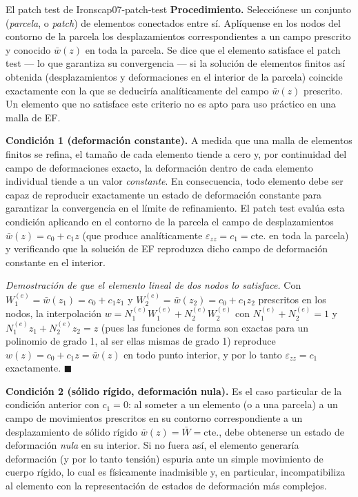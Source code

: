 \begin{teorema}{El patch test de Irons}{cap07-patch-test}
\textbf{Procedimiento.} Selecciónese un conjunto (\emph{parcela}, o \emph{patch}) de elementos conectados entre sí. Aplíquense en los nodos del contorno de la parcela los desplazamientos correspondientes a un campo prescrito y conocido $\bar w(z)$ en toda la parcela. Se dice que el elemento satisface el patch test --- lo que garantiza su convergencia --- si la solución de elementos finitos así obtenida (desplazamientos y deformaciones en el interior de la parcela) coincide exactamente con la que se deduciría analíticamente del campo $\bar w(z)$ prescrito. Un elemento que no satisface este criterio no es apto para uso práctico en una malla de EF.

\textbf{Condición 1 (deformación constante).} A medida que una malla de elementos finitos se refina, el tamaño de cada elemento tiende a cero y, por continuidad del campo de deformaciones exacto, la deformación dentro de cada elemento individual tiende a un valor \emph{constante}. En consecuencia, todo elemento debe ser capaz de reproducir exactamente un estado de deformación constante para garantizar la convergencia en el límite de refinamiento. El patch test evalúa esta condición aplicando en el contorno de la parcela el campo de desplazamientos $\bar w(z) = c_0 + c_1 z$ (que produce analíticamente $\varepsilon_{zz}=c_1=\text{cte.}$ en toda la parcela) y verificando que la solución de EF reproduzca dicho campo de deformación constante en el interior.

\emph{Demostración de que el elemento lineal de dos nodos lo satisface.} Con $W_1^{(e)}=\bar w(z_1)=c_0+c_1z_1$ y $W_2^{(e)}=\bar w(z_2)=c_0+c_1z_2$ prescritos en los nodos, la interpolación $w=N_1^{(e)}W_1^{(e)}+N_2^{(e)}W_2^{(e)}$ con $N_1^{(e)}+N_2^{(e)}=1$ y $N_1^{(e)}z_1+N_2^{(e)}z_2=z$ (pues las funciones de forma son exactas para un polinomio de grado 1, al ser ellas mismas de grado 1) reproduce $w(z)=c_0+c_1z=\bar w(z)$ en todo punto interior, y por lo tanto $\varepsilon_{zz}=c_1$ exactamente. $\blacksquare$

\textbf{Condición 2 (sólido rígido, deformación nula).} Es el caso particular de la condición anterior con $c_1=0$: al someter a un elemento (o a una parcela) a un campo de movimientos prescritos en su contorno correspondiente a un desplazamiento de sólido rígido $\bar w(z) = \bar W = \text{cte.}$, debe obtenerse un estado de deformación \emph{nula} en su interior. Si no fuera así, el elemento generaría deformación (y por lo tanto tensión) espuria ante un simple movimiento de cuerpo rígido, lo cual es físicamente inadmisible y, en particular, incompatibiliza al elemento con la representación de estados de deformación más complejos.


\end{teorema}

